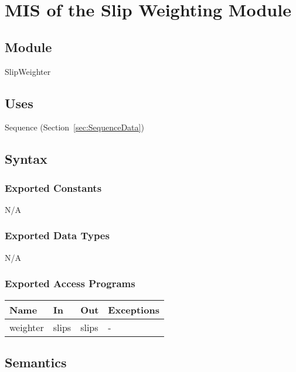 \documentclass[12pt, titlepage]{article}
\begin{document}

\section{MIS of the Slip Weighting
	Module} \label{sec:WeightMod}

\subsection{Module}
SlipWeighter

\subsection{Uses}
Sequence (Section~\ref{sec:SequenceData})

\subsection{Syntax}

\subsubsection{Exported Constants}
N/A

\subsubsection{Exported Data Types}
N/A

\subsubsection{Exported Access Programs}

\begin{center}
	\renewcommand*{\arraystretch}{1.5}
	\begin{tabular} {p{}  p{}  p{} 
			p{} } \hline 
		\textbf{Name} & \textbf{In} & \textbf{Out} & \textbf{Exceptions} \\ 
		\hline
		
		weighter & slips & slips & - \\ \hline
	\end{tabular}
\end{center}

\subsection{Semantics}
\end{document}
